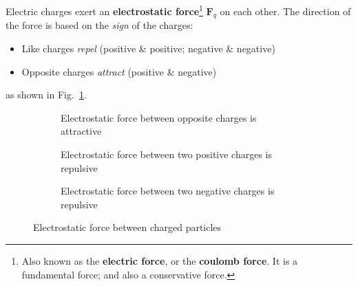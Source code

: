 Electric charges exert an \textbf{electrostatic force}\footnote{Also known as
the \textbf{electric force}, or the \textbf{coulomb force}. It is a
fundamental force; and also a conservative force.} $\bm F_q$ on each other.
The direction of the force is based on the \emph{sign} of the charges:
\begin{itemize}
\item Like charges \emph{repel} (positive \& positive; negative \& negative)
\item Opposite charges \emph{attract} (positive \& negative)
\end{itemize}
as shown in Fig.~\ref{fig:coulomb-charge}.
\begin{figure}[ht]
  \centering
  \begin{subfigure}{.7\linewidth}
    \centering
    \caption{Electrostatic force between opposite charges is attractive}
  \end{subfigure}
  
  \begin{subfigure}{.7\linewidth}
    \centering
    \caption{Electrostatic force between two positive charges is repulsive}
  \end{subfigure}
  
  \begin{subfigure}{.7\linewidth}
    \centering
     \caption{Electrostatic force between two negative charges is repulsive}
  \end{subfigure}
  \caption{Electrostatic force between charged particles}
  \label{fig:coulomb-charge}
\end{figure}

